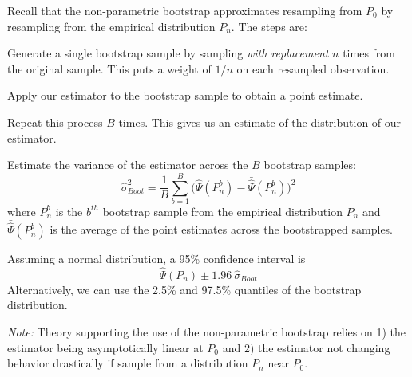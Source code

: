 \documentclass[answers]{exam}
\newenvironment{packed_enum}{
\begin{enumerate}
 \setlength{\itemsep}{0pt}
  \setlength{\parskip}{0pt}
  \setlength{\parsep}{0pt}
}{\end{enumerate}}
\begin{document}
Recall that the non-parametric bootstrap approximates resampling from $P_0$ by resampling from the empirical distribution $P_n$. The steps are:
\vspace{-1em}
\begin{packed_enum}
\item Generate a single bootstrap sample by sampling \emph{with replacement} $n$ times from the original sample. This puts a weight of $1/n$ on each resampled observation.
\item Apply our estimator to the bootstrap sample to obtain a point estimate.
\item Repeat this process $B$ times. This gives us an estimate of the distribution of our estimator.
\item Estimate the variance of the estimator across the $B$ bootstrap samples: \[
\hat{\sigma}^2_{Boot} = \frac{1}{B} \sum_{b=1}^B \bigg(\hat{\Psi}(P_n^b) - \bar{\hat{\Psi}}(P_n^b) \bigg)^2
\]
where $P_n^b$ is the $b^{th}$ bootstrap sample from the empirical distribution $P_n$ and $\bar{\hat{\Psi}}(P_n^b)$ is the average of the point estimates across the bootstrapped samples.
\item Assuming a normal distribution, a 95\% confidence interval is \[
\hat{\Psi}(P_n) \pm 1.96 \ \hat{\sigma}_{Boot}
\]
Alternatively, we can use the 2.5\% and 97.5\% quantiles of the bootstrap distribution.
\end{packed_enum}
\emph{Note:} Theory supporting the use of the non-parametric bootstrap relies on 1) the estimator being asymptotically linear at $P_0$ and 2) the estimator not changing behavior drastically if sample from a distribution $P_n$ near $P_0$. 
\end{document}
